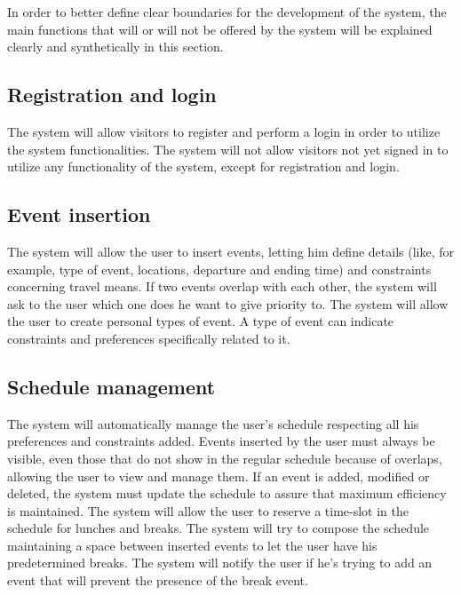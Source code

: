 In order to better define clear boundaries for the development of the system, the main functions that  will or will not be offered by the system will be explained clearly and synthetically in this section.

\subsection{Registration and login}
The system will allow visitors to register and perform a login in order to utilize the system functionalities. 
\newline
The system will not allow visitors not yet signed in to utilize any functionality of the system, except for registration and login.

\subsection{Event insertion}
The system will allow the user to insert events, letting him define details (like, for example, type of event, locations, departure and ending time) and constraints concerning travel means.
\newline
If two events overlap with each other, the system will ask to the user which one does he want to give priority to.
\newline
The system will allow the user to create personal types of event.
A type of event can indicate constraints and preferences specifically related to it.

\subsection{Schedule management}
The system will automatically manage the user's schedule respecting all his preferences and constraints added.
\newline
Events inserted by the user must always be visible, even those that do not show in the regular schedule because of overlaps, allowing the user to view and manage them.
\newline
If an event is added, modified or deleted, the system must update the schedule to assure that maximum efficiency is maintained.
\newline
The system will allow the user to reserve a time-slot in the schedule for lunches and breaks. 
\newline
The system will try to compose the schedule maintaining a space between inserted events to let the user have his predetermined breaks.
\newline
The system will notify the user if he's trying to add an event that will prevent the presence of the break event.

